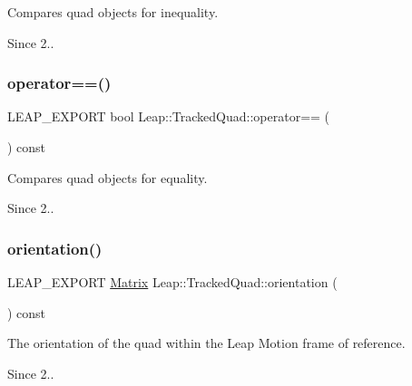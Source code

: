 Compares quad objects for inequality. \begin{DoxySince}{Since}
2.. 
\end{DoxySince}
\mbox{\label{class_leap_1_1_tracked_quad_a728752126b184f5e8d2bc22b77897662}} 
\subsubsection{\texorpdfstring{operator==()}{operator==()}}
{\footnotesize\ttfamily L\+E\+A\+P\+\_\+\+E\+X\+P\+O\+RT bool Leap\+::\+Tracked\+Quad\+::operator== (\begin{DoxyParamCaption}\item[{const \hyperlink{class_leap_1_1_tracked_quad}{Tracked\+Quad} \&}]{ }\end{DoxyParamCaption}) const}

Compares quad objects for equality. \begin{DoxySince}{Since}
2.. 
\end{DoxySince}
\mbox{\label{class_leap_1_1_tracked_quad_ac382fefda8c3c3d4dc8791d7f74d1a56}} 
\subsubsection{\texorpdfstring{orientation()}{orientation()}}
{\footnotesize\ttfamily L\+E\+A\+P\+\_\+\+E\+X\+P\+O\+RT \hyperlink{struct_leap_1_1_matrix}{Matrix} Leap\+::\+Tracked\+Quad\+::orientation (\begin{DoxyParamCaption}{ }\end{DoxyParamCaption}) const}

The orientation of the quad within the Leap Motion frame of reference. 
\begin{DoxyCodeInclude}
\end{DoxyCodeInclude}
 \begin{DoxySince}{Since}
2.. 
\end{DoxySince}
\mbox{\label{class_leap_1_1_tracked_quad_a3c5aac36dc71997c5244fc9d248ae98f}} 
